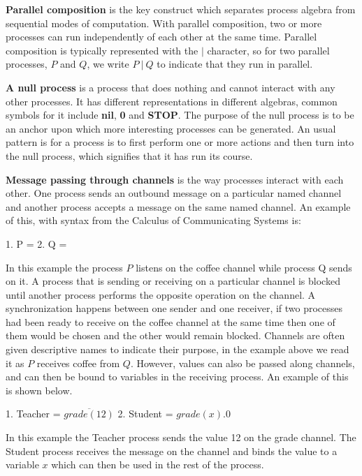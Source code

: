 	\textbf{Parallel composition} is the key construct which separates process 
	algebra from sequential modes of computation. With parallel composition, two 
	or more processes can run independently of each other at the same time. 
	Parallel composition is typically represented with the $|$ character, so for 
	two parallel processes, $P$ and $Q$, we write $P\ |\ Q$ to indicate that 
	they run in parallel.

	\textbf{A null process} is a process that does nothing and cannot interact 
	with any other processes. It has different representations in different 
	algebras, common symbols for it include \textbf{nil}, \textbf{0} and 
	\textbf{STOP}. The purpose of the null process is to be an anchor upon which 
	more interesting processes can be generated. An usual pattern is for a 
	process is to first perform one or more actions and then turn into the null 
	process, which signifies that it has run its course.
	
	\textbf{Message passing through channels} is the way processes interact with 
	each other. One process sends an outbound message on a particular named 
	channel and another process accepts a message on the same named channel. An 
	example of this, with syntax from the Calculus of Communicating Systems is:
	
			1. P = %
			2. Q = %
			
	In this example the process $P$ listens on the \textsf{coffee} channel while 
	process Q sends on it. A process that is sending or receiving on a 
	particular channel is blocked until another process performs the opposite 
	operation on the channel. A synchronization happens between one sender and 
	one receiver, if two processes had been ready to receive on the 
	\textsf{coffee} channel at the same time then one of them would be chosen 
	and the other would remain blocked. Channels are often given descriptive 
	names to indicate their purpose, in the example above we read it as $P$ 
	receives coffee from $Q$. However, values can also be passed along channels, 
	and can then be bound to variables in the receiving process. An example of 
	this is shown below.
	
			1. Teacher = $\overline{grade(12)}$
			2. Student = $grade(x) . 0$
	
	In this example the \textsf{Teacher} process sends the value 12 on the 
	\textsf{grade} channel. The \textsf{Student} process receives the message on 
	the channel and binds the value to a variable $x$ which can then be used in 
	the rest of the process.
	
